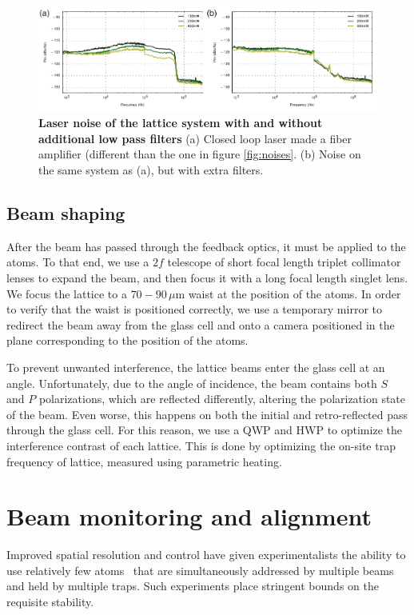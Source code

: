 \documentclass[twocolumn,aps,pra,showpacs,preprintnumbers,bibnotes]{revtex4-1}
\begin{document}
\begin{figure}
  \begin{center}
    \includegraphics{fig/low_pass_filters.pdf}
    \caption{\textbf{Laser noise of the lattice system with and without additional low pass filters} (a) Closed loop laser made a fiber amplifier (different than the one in figure \ref{fig:noises}. (b) Noise on the same system as (a), but with extra filters.}\label{fig:low_pass_noises}
  \end{center}
\end{figure}


\subsection{Beam shaping}
After the beam has passed through the feedback optics, it must be applied to the atoms. To that end, we use a $2f$ telescope of short focal length triplet collimator lenses to expand the beam, and then focus it with a long focal length singlet lens.
We focus the lattice to a $70-90$\,$\mu$m waist at the position of the atoms.
In order to verify that the waist is positioned correctly, we use a temporary mirror to redirect the beam away from the glass cell and onto a camera positioned in the plane corresponding to the position of the atoms.

To prevent unwanted interference, the lattice beams enter the glass cell at an angle. 
Unfortunately, due to the angle of incidence, the beam contains both $S$ and $P$ polarizations, which are reflected differently, altering the polarization state of the beam.
Even worse, this happens on both the initial and retro-reflected pass through the glass cell.
For this reason, we use a QWP and HWP to optimize the interference contrast of each lattice.
This is done by optimizing the on-site trap frequency of lattice, measured using parametric heating.

\section{Beam monitoring and alignment}
Improved spatial resolution and control have given experimentalists the ability to use relatively few atoms~\cite{Preiss2015, Choi2016, Mazurenko2016} that are simultaneously addressed by multiple beams and held by multiple traps.
Such experiments place stringent bounds on the requisite stability. 
\end{document}
